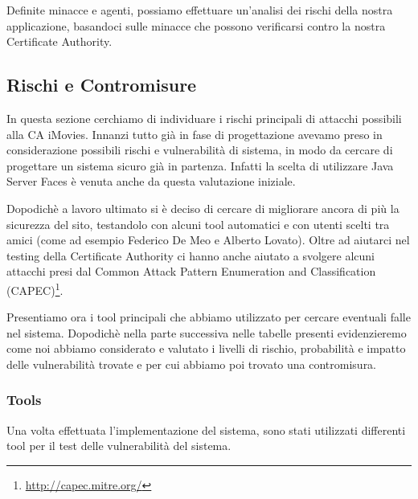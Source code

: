 \documentclass{article}
\begin{document}
Definite minacce e agenti, possiamo effettuare un'analisi dei rischi della nostra applicazione, basandoci sulle minacce che possono verificarsi contro la nostra Certificate Authority.

\subsection{Rischi e Contromisure}
In questa sezione cerchiamo di individuare i rischi principali di attacchi possibili alla CA iMovies.
Innanzi tutto già in fase di progettazione avevamo preso in considerazione possibili rischi e vulnerabilità di sistema, in modo da cercare di progettare un sistema sicuro già in partenza.
Infatti la scelta di utilizzare Java Server Faces è venuta anche da questa valutazione iniziale.

Dopodichè a lavoro ultimato si è deciso di cercare di migliorare ancora di più la sicurezza del sito, testandolo con alcuni tool automatici e con utenti scelti tra amici (come ad esempio Federico De Meo e Alberto Lovato). Oltre ad aiutarci nel testing della Certificate Authority ci hanno anche aiutato a svolgere alcuni attacchi presi dal Common Attack Pattern Enumeration and Classification (CAPEC)\footnote{\url{http://capec.mitre.org/}}.

Presentiamo ora i tool principali che abbiamo utilizzato per cercare eventuali falle nel sistema. Dopodichè nella parte successiva nelle tabelle presenti evidenzieremo come noi abbiamo considerato e valutato i livelli di rischio, probabilità e impatto delle vulnerabilità trovate e per cui abbiamo poi trovato una contromisura.

\subsubsection{Tools}
Una volta effettuata l'implementazione del sistema, sono stati utilizzati differenti tool per il test delle vulnerabilità del sistema.
\end{document}
